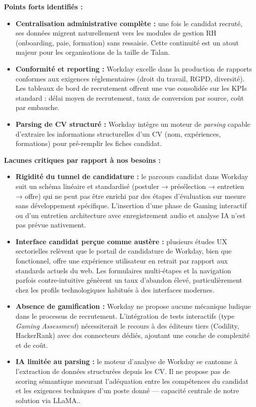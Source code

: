 \medskip
\textbf{Points forts identifiés :}
\begin{itemize}
    \item \textbf{Centralisation administrative complète :} une fois le candidat recruté, ses données migrent naturellement vers les modules de gestion RH (onboarding, paie, formation) sans ressaisie. Cette continuité est un atout majeur pour les organisations de la taille de Talan.
    \item \textbf{Conformité et reporting :} Workday excelle dans la production de rapports conformes aux exigences réglementaires (droit du travail, RGPD, diversité). Les tableaux de bord de recrutement offrent une vue consolidée sur les KPIs standard : délai moyen de recrutement, taux de conversion par source, coût par embauche.
    \item \textbf{Parsing de CV structuré :} Workday intègre un moteur de \textit{parsing} capable d'extraire les informations structurelles d'un CV (nom, expériences, formations) pour pré-remplir les fiches candidat.
\end{itemize}

\textbf{Lacunes critiques par rapport à nos besoins :}
\begin{itemize}
    \item \textbf{Rigidité du tunnel de candidature :} le parcours candidat dans Workday suit un schéma linéaire et standardisé (postuler → présélection → entretien → offre) qui ne peut pas être enrichi par des étapes d'évaluation sur mesure sans développement spécifique. L'insertion d'une phase de Gaming interactif ou d'un entretien architecture avec enregistrement audio et analyse IA n'est pas prévue nativement.
    \item \textbf{Interface candidat perçue comme austère :} plusieurs études UX sectorielles relèvent que le portail de candidature de Workday, bien que fonctionnel, offre une expérience utilisateur en retrait par rapport aux standards actuels du web. Les formulaires multi-étapes et la navigation parfois contre-intuitive génèrent un taux d'abandon élevé, particulièrement chez les profils technologiques habitués à des interfaces modernes.
    \item \textbf{Absence de gamification :} Workday ne propose aucune mécanique ludique dans le processus de recrutement. L'intégration de tests interactifs (type \textit{Gaming Assessment}) nécessiterait le recours à des éditeurs tiers (Codility, HackerRank) avec des connecteurs dédiés, ajoutant une couche de complexité et de coût.
    \item \textbf{IA limitée au parsing :} le moteur d'analyse de Workday se cantonne à l'extraction de données structurées depuis les CV. Il ne propose pas de scoring sémantique mesurant l'adéquation entre les compétences du candidat et les exigences techniques d'un poste donné --- capacité centrale de notre solution via LLaMA.\parencite{URL25}.
\end{itemize}

